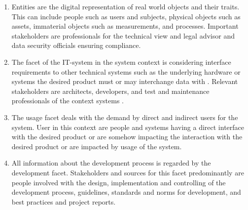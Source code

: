 \begin{enumerate}
    \item Entities are the digital representation of real world objects and their traits. This can include people such as users and subjects, physical objects such as assets, immaterial objects such as measurements, and processes. Important stakeholders are  professionals for the technical view and legal advisor and data security officials ensuring compliance. \parencite[cf.][70-71]{Pohl.2007}
    \item The facet of the IT-system in the system context is considering interface requirements to other technical systems such as the underlying hardware or systems the desired product must or may interchange data with \parencite[cf.][192]{Kotonya.2000}. Relevant stakeholders are architects, developers, and test and maintenance professionals of the context systems \parencite[cf.][72]{Pohl.2007}.
    \item The usage facet deals with the demand by direct and indirect users for the system. User in this context are people and systems having a direct interface with the desired product or are somehow impacting the interaction with the desired product or are impacted by usage of the system. \parencite[cf.][75-77]{Pohl.2007}
    \item All information about the development process is regarded by the development facet. Stakeholders and sources for this facet predominantly are people involved with the design, implementation and controlling of the development process, guidelines, standards and norms for development, and best practices and project reports. \parencite[cf.][79]{Pohl.2007}
\end{enumerate}

